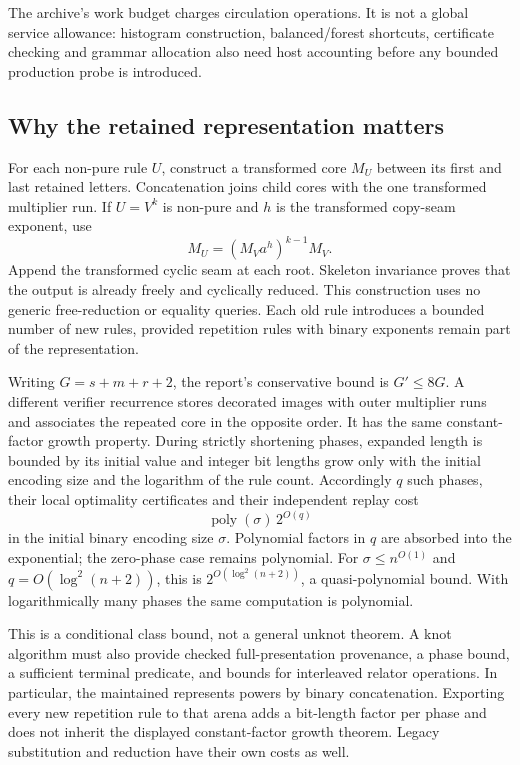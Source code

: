 The archive's work budget charges circulation operations. It is not a global
service allowance: histogram construction, balanced/forest shortcuts,
certificate checking and grammar allocation also need host accounting before
any bounded production probe is introduced.

\subsection{Why the retained representation matters}

For each non-pure rule $U$, construct a transformed core $M_U$ between its
first and last retained letters. Concatenation joins child cores with the
one transformed multiplier run. If $U=V^k$ is non-pure and $h$ is the
transformed copy-seam exponent, use
\[
 M_U=(M_Va^h)^{k-1}M_V.
\]
Append the transformed cyclic seam at each root. Skeleton invariance proves
that the output is already freely and cyclically reduced. This construction
uses no generic free-reduction or equality queries. Each old rule introduces
a bounded number of new rules, provided repetition rules with binary
exponents remain part of the representation.

Writing $G=s+m+r+2$, the report's conservative bound is $G'\le8G$.
A different verifier recurrence stores decorated images with outer multiplier
runs and associates the repeated core in the opposite order. It has the same
constant-factor growth property. During strictly shortening phases, expanded
length is bounded by its initial value and integer bit lengths grow only
with the initial encoding size and the logarithm of the rule count.
Accordingly $q$ such phases, their local optimality certificates and their
independent replay cost
\[
 \operatorname{poly}(\sigma)\,2^{O(q)}
\]
in the initial binary encoding size $\sigma$. Polynomial factors in $q$
are absorbed into the exponential; the zero-phase case remains polynomial.
For $\sigma\le n^{O(1)}$ and $q=O(\log^2(n+2))$, this is
$2^{O(\log^2(n+2))}$, a quasi-polynomial bound. With logarithmically many
phases the same computation is polynomial.

This is a conditional class bound, not a general unknot theorem. A knot
algorithm must also provide checked full-presentation provenance, a phase
bound, a sufficient terminal predicate, and bounds for interleaved relator
operations. In particular, the maintained  represents powers
by binary concatenation. Exporting every new repetition rule to that arena
adds a bit-length factor per phase and does not inherit the displayed
constant-factor growth theorem. Legacy substitution and reduction have their
own costs as well.

